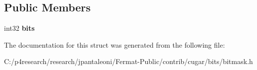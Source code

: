 \subsection*{Public Members}
\begin{DoxyCompactItemize}
\item 
\mbox{\label{structcugar_1_1_bitmask_3_011_01_4_a53ad85c530c480cf07e6c3a622d12691}} 
int32 {\bfseries bits}
\end{DoxyCompactItemize}


The documentation for this struct was generated from the following file\+:\begin{DoxyCompactItemize}
\item 
C\+:/p4research/research/jpantaleoni/\+Fermat-\/\+Public/contrib/cugar/bits/bitmask.\+h\end{DoxyCompactItemize}
